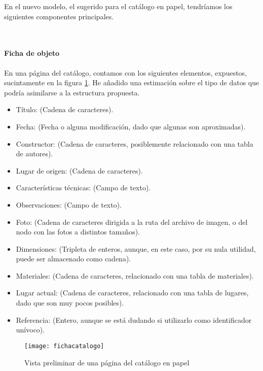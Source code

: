 \par En el nuevo modelo, el sugerido para el catálogo en papel, tendríamos los siguientes componentes principales.

~\paragraph{Ficha de objeto}
\par En una página del catálogo, contamos con los siguientes elementos, expuestos, sucintamente en la figura \ref{fig:fichacatalogo}. He añadido una estimación sobre el tipo de datos que podría asimilarse a la estructura propuesta.

\begin{itemize}
 \item Título: (Cadena de caracteres).
 \item Fecha: (Fecha o alguna modificación, dado que algunas son aproximadas).
 \item Constructor: (Cadena de caracteres, posiblemente relacionado con una tabla de autores).
 \item Lugar de origen: (Cadena de caracteres).
 \item Características técnicas: (Campo de texto).
 \item Observaciones: (Campo de texto).
 \item Foto: (Cadena de caracteres dirigida a la ruta del archivo de imagen, o del nodo con las fotos a distintos tamaños).
 \item Dimensiones: (Tripleta de enteros, aunque, en este caso, por su nula utilidad, puede ser almacenado como cadena).
 \item Materiales: (Cadena de caracteres, relacionado con una tabla de materiales).
 \item Lugar actual: (Cadena de caracteres, relacionado con una tabla de lugares, dado que son muy pocos posibles).
 \item Referencia: (Entero, aunque se está dudando si utilizarlo como identificador unívoco).
\end{itemize}

  \begin{figure}[h!]
    \begin{narrow}{-1cm}{-1cm}
      \centering
      \texttt{[image: fichacatalogo]}
      \caption{Vista preliminar de una página del catálogo en papel}
      \label{fig:fichacatalogo}
    \end{narrow}
  \end{figure}


